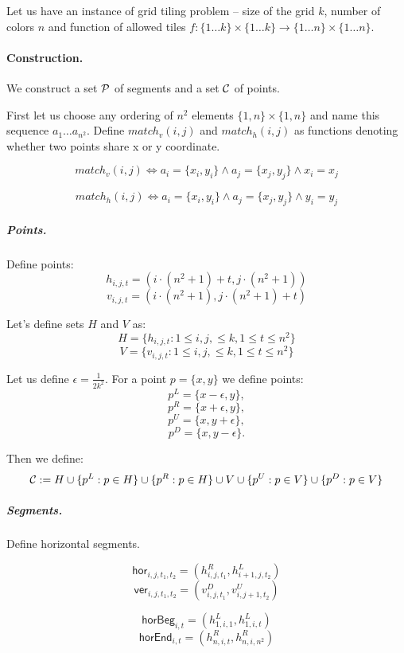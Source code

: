 Let us have an instance of grid tiling problem -- size of the
grid $k$, number of colors $n$
and function of allowed tiles
$f : \{1 \ldots k\} \times \{1 \ldots k\} \rightarrow \{1 \ldots n\} \times \{1 \ldots n\}$.

\paragraph{Construction.}
We construct a set $\mathcal{P}$ of segments and a set $\mathcal{C}$
of points.

First let us choose any ordering of $n^2$ elements
$\{1,n\} \times \{1,n\}$ and name this sequence $a_1 \ldots a_{n^2}$.
Define $match_v(i, j)$ and $match_h(i, j)$
as functions denoting whether two points share x or y coordinate.

$$match_v(i, j) \iff
a_i = \{x_i, y_i\} \land a_j = \{x_j, y_j\} \land x_i = x_j$$

$$match_h(i, j) \iff
a_i = \{x_i, y_i\} \land a_j = \{x_j, y_j\} \land y_i = y_j$$


\subparagraph{Points.}

Define points:
	$$h_{i, j, t} = (i \cdot (n^2+1) + t, j \cdot (n^2+1))$$
	$$v_{i, j, t} = (i \cdot (n^2+1), j \cdot (n^2+1) + t)$$
	
Let's define sets $H$ and $V$ as:
$$H = \{h_{i, j, t} : 1 \le i, j, \le k, 1 \le t \le n^2\}$$
$$V = \{v_{i, j, t} : 1 \le i, j, \le k, 1 \le t \le n^2\}$$
	
Let us define $\epsilon = \frac{1}{2k^2}$.
For a point $p = \{x, y\}$ we define points:
$$p^{L} = \{x - \epsilon, y\},$$
$$p^{R} = \{x + \epsilon, y\},$$
$$p^{U} = \{x, y + \epsilon\},$$
$$p^{D} = \{x, y - \epsilon\}.$$

Then we define:
$$\mathcal{C} := H \cup \{p^L : p \in H\} \cup \{p^R : p \in H\}
\cup V \cup \{p^U : p \in V\} \cup \{p^D : p \in V\} $$


\subparagraph{Segments.}
Define horizontal segments.

\newcommand{\hor}[4]{\mathsf{hor}_{#1,#2,#3,#4}}
\newcommand{\ver}[4]{\mathsf{ver}_{#1,#2,#3,#4}}
\newcommand{\horbeg}[2]{\mathsf{horBeg}_{#1,#2}}
\newcommand{\verbeg}[2]{\mathsf{verBeg}_{#1,#2}}
\newcommand{\horend}[2]{\mathsf{horEnd}_{#1,#2}}
\newcommand{\verend}[2]{\mathsf{verEnd}_{#1,#2}}

$$\hor{i}{j}{t_1}{t_2} = (h^R_{i,j,t_1}, h^L_{i+1, j, t_2})$$
$$\ver{i}{j}{t_1}{t_2} = (v^D_{i,j,t_1}, v^U_{i, j+1, t_2})$$

$$\horbeg{i}{t} = (h^L_{1, i, 1}, h^L_{1, i, t})$$
$$\horend{i}{t} = (h^R_{n, i, t}, h^R_{n, i, n^2})$$


